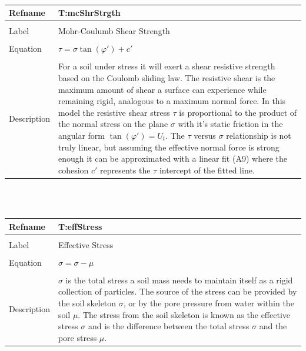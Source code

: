 \documentclass[12pt]{article}
\begin{document}
~\newline
\noindent \begin{minipage}{\textwidth}
\begin{tabular}{p{} p{}}
\toprule \textbf{Refname} & \textbf{T:mcShrStrgth}
\label{T:mcShrStrgth}
\\ \midrule \\
Label & Mohr-Coulumb Shear Strength
\\ \midrule \\
Equation & $\tau{}=\sigma{} \tan\left(\varphi{}'\right)+c'$
\\ \midrule \\
Description & For a soil under stress it will exert a shear resistive strength based on the Coulomb sliding law. The resistive shear is the maximum amount of shear a surface can experience while remaining rigid, analogous to a maximum normal force. In this model the resistive shear stress $\tau{}$ is proportional to the product of the normal stress on the plane $\sigma{}$ with it's static friction in the angular form $\tan\left(\varphi{}'\right)={U_{t}}$. The $\tau{}$ versus $\sigma{}$ relationship is not truly linear, but assuming the effective normal force is strong enough it can be approximated with a linear fit (A9) where the cohesion $c'$ represents the $\tau{}$ intercept of the fitted line.
\\ \bottomrule \end{tabular}
\end{minipage}\\
~\newline
\noindent \begin{minipage}{\textwidth}
\begin{tabular}{p{} p{}}
\toprule \textbf{Refname} & \textbf{T:effStress}
\label{T:effStress}
\\ \midrule \\
Label & Effective Stress
\\ \midrule \\
Equation & $\sigma{}=\sigma{}-\mu{}$
\\ \midrule \\
Description & $\sigma{}$ is the total stress a soil mass needs to maintain itself as a rigid collection of particles. The source of the stress can be provided by the soil skeleton $\sigma{}$, or by the pore pressure from water within the soil $\mu{}$. The stress from the soil skeleton is known as the effective stress $\sigma{}$ and is the difference between the total stress $\sigma{}$ and the pore stress $\mu{}$.
\\ \bottomrule \end{tabular}
\end{minipage}\\
\end{document}
